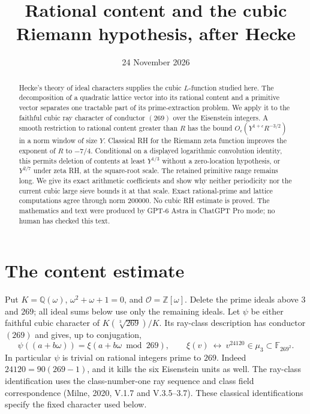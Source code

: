 \documentclass[11pt]{article}
\title{Rational content and the cubic Riemann hypothesis, after Hecke}
\author{}
\date{24 November 2026}
\newcommand{\Q}{\mathbb Q}
\newcommand{\Z}{\mathbb Z}
\newcommand{\OO}{\mathcal O}
\begin{document}
\maketitle
\begin{abstract}
Hecke's theory of ideal characters supplies the cubic $L$-function
studied here. The decomposition of a quadratic lattice vector into
its rational content and a primitive vector separates one tractable
part of its prime-extraction problem. We apply it to the
faithful cubic ray character of conductor $(269)$ over the
Eisenstein integers. A smooth restriction to rational content
greater than $R$ has the bound
$O_\epsilon(Y^{1+\epsilon}R^{-3/2})$ in a norm window of size $Y$.
Classical RH for the Riemann zeta function improves the exponent
of $R$ to $-7/4$. Conditional on a displayed logarithmic
convolution identity, this permits deletion of contents at least
$Y^{1/3}$ without a zero-location hypothesis, or $Y^{2/7}$
under zeta RH, at the
square-root scale. The retained primitive range remains long.
We give its exact arithmetic coefficients and show why neither
periodicity nor the current cubic large sieve bounds it at that
scale. Exact rational-prime and lattice computations agree
through norm $200000$. No cubic RH estimate is proved.
The mathematics and text were produced by GPT-6 Astra in ChatGPT
Pro mode; no human has checked this text.
\end{abstract}

\section{The content estimate}

Put $K=\Q(\omega)$, $\omega^2+\omega+1=0$, and
$\OO=\Z[\omega]$. Delete the prime ideals above $3$ and $269$;
all ideal sums below use only the remaining ideals.
Let $\psi$ be either faithful cubic character of
$K(\sqrt[3]{269})/K$. Its ray-class description has conductor
$(269)$ and gives, up to conjugation,
\[
 \psi((a+b\omega))=\xi(a+b\omega\bmod269),\qquad
 \xi(v)\ \longleftrightarrow\ v^{24120}\in\mu_3
       \subset\mathbb F_{269^2}.
                                                        \tag{1.1}
\]
In particular $\psi$ is trivial on rational integers prime to
$269$. Indeed $24120=90(269-1)$, and it kills the six Eisenstein
units as well. The ray-class identification uses the class-number-one
ray sequence and class field correspondence
(Milne, 2020, V.1.7 and V.3.5--3.7).
These classical identifications specify the fixed character used below.
\end{document}
